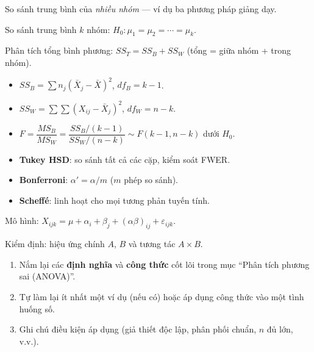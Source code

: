 \documentclass[12pt,a4paper]{article}
\begin{document}
\begin{dongco}[title={Động cơ --- Phân tích phương sai (ANOVA)}]
So sánh trung bình của \emph{nhiều nhóm} --- ví dụ ba phương pháp giảng dạy.
\end{dongco}

\begin{dinhnghia}[title={ANOVA một yếu tố}]
  So sánh trung bình $k$ nhóm: $H_0: \mu_1 = \mu_2 = \cdots = \mu_k$.

  Phân tích tổng bình phương: $SS_T = SS_B + SS_W$ (tổng = giữa nhóm + trong nhóm).
\end{dinhnghia}

\begin{congthuc}[title={Bảng ANOVA}]
  \begin{itemize}
    \item $SS_B = \sum n_j(\bar{X}_j - \bar{X})^2$, \;$df_B = k - 1$.
    \item $SS_W = \sum\sum(X_{ij} - \bar{X}_j)^2$, \;$df_W = n - k$.
    \item $F = \dfrac{MS_B}{MS_W} = \dfrac{SS_B/(k-1)}{SS_W/(n-k)} \sim F(k-1, n-k)$ dưới $H_0$.
  \end{itemize}
\end{congthuc}

\begin{phuongphap}[title={So sánh hậu kiểm (post-hoc)}]
  \begin{itemize}
    \item \textbf{Tukey HSD}: so sánh tất cả các cặp, kiểm soát FWER.
    \item \textbf{Bonferroni}: $\alpha' = \alpha/m$ ($m$ phép so sánh).
    \item \textbf{Scheffé}: linh hoạt cho mọi tương phản tuyến tính.
  \end{itemize}
\end{phuongphap}

\begin{dinhnghia}[title={ANOVA hai yếu tố}]
  Mô hình: $X_{ijk} = \mu + \alpha_i + \beta_j + (\alpha\beta)_{ij} + \varepsilon_{ijk}$.

  Kiểm định: hiệu ứng chính $A$, $B$ và tương tác $A \times B$.
\end{dinhnghia}

\begin{tongket}[title={Tổng kết: Phân tích phương sai (ANOVA)}]
\begin{enumerate}
  \item Nắm lại các \textbf{định nghĩa} và \textbf{công thức} cốt lõi trong mục ``Phân tích phương sai (ANOVA)''.
  \item Tự làm lại ít nhất một ví dụ (nếu có) hoặc áp dụng công thức vào một tình huống số.
  \item Ghi chú điều kiện áp dụng (giả thiết độc lập, phân phối chuẩn, $n$ đủ lớn, v.v.).
\end{enumerate}
\end{tongket}
\end{document}
